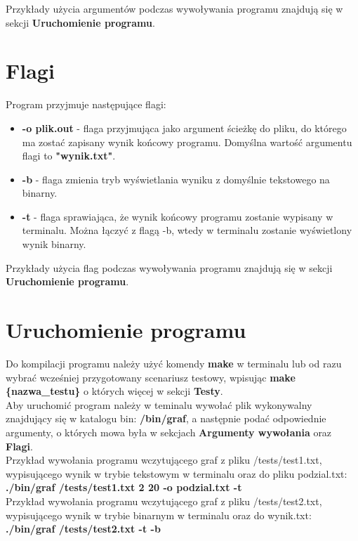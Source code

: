 \documentclass{article}
\begin{document}
Przykłady użycia argumentów podczas wywoływania programu znajdują się w sekcji \textbf{Uruchomienie programu}.

\section*{Flagi}
Program przyjmuje następujące flagi:
\begin{itemize}
    \item \textbf{-o plik.out} - flaga przyjmująca jako argument ścieżkę do pliku, do którego ma zostać zapisany wynik końcowy programu. Domyślna wartość argumentu flagi to \textbf{"wynik.txt"}.

    \item \textbf{-b} - flaga zmienia tryb wyświetlania wyniku z domyślnie tekstowego na binarny.

    \item \textbf{-t} - flaga sprawiająca, że wynik końcowy programu zostanie wypisany w terminalu. Można łączyć z flagą -b, wtedy w terminalu zostanie wyświetlony wynik binarny.
\end{itemize}

Przykłady użycia flag podczas wywoływania programu znajdują się w sekcji \textbf{Uruchomienie programu}.

\section*{Uruchomienie programu}
Do kompilacji programu należy użyć komendy \textbf{make} w terminalu lub od razu wybrać wcześniej przygotowany scenariusz testowy, wpisując \textbf{make \{nazwa\_testu\}} o których więcej w sekcji \textbf{Testy}.
\\

Aby uruchomić program należy w teminalu wywołać plik wykonywalny znajdujący się w katalogu bin: \textbf{/bin/graf}, a następnie podać odpowiednie argumenty, o których mowa była w sekcjach \textbf{Argumenty wywołania} oraz \textbf{Flagi}.\\

Przykład wywołania programu wczytującego graf z pliku /tests/test1.txt, wypisującego wynik w trybie tekstowym w terminalu oraz do pliku podzial.txt:
\textbf{./bin/graf /tests/test1.txt 2 20 -o podzial.txt -t}\\

Przykład wywołania programu wczytującego graf z pliku /tests/test2.txt, wypisującego wynik w trybie binarnym w terminalu oraz do wynik.txt:\\
\textbf{./bin/graf /tests/test2.txt -t -b}
\end{document}
